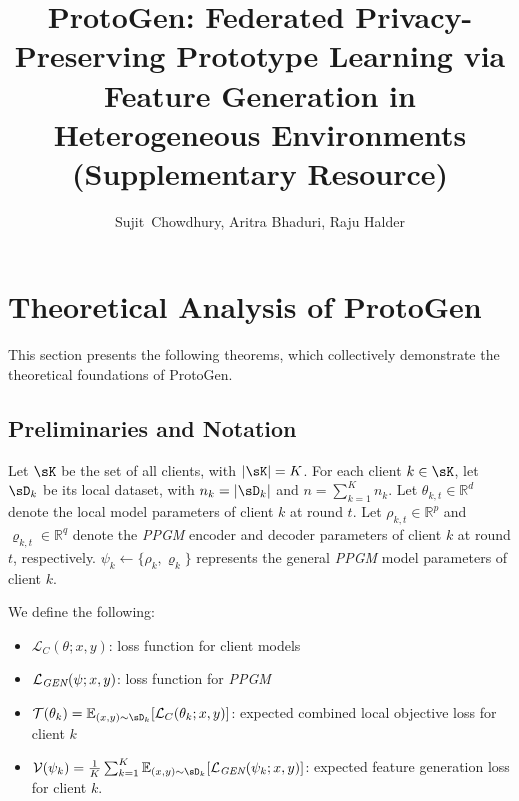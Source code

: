 \documentclass[lettersize,journal]{IEEEtran}
\title{\textsf{ProtoGen}: Federated Privacy-Preserving Prototype Learning via Feature Generation in Heterogeneous Environments\\ (Supplementary Resource)}
\author{Sujit~Chowdhury, Aritra Bhaduri, Raju Halder%
\IEEEcompsocitemizethanks{\IEEEcompsocthanksitem Sujit Chowdhury, Aritra Bhaduri, Raju Halder are with the Department
of Computer Science and Engineering, Indian Institute of Technology Patna, 
India, 801106.\protect\\
E-mail: \{sujit\_2021cs35, aritra\_2101ai40, halder\}@iitp.ac.in}
}
\begin{document}
\maketitle

\section{Theoretical Analysis of \textsf{ProtoGen}}\label{sec-th}

This section presents the following theorems, which collectively demonstrate the theoretical foundations of \textsf{ProtoGen}.

\subsection{Preliminaries and Notation}

Let $\sK$ be the set of all clients, with $|\sK| = K$. For each client $k \in \sK$, let $\sD_k$ be its local dataset, with $n_k = |\sD_k|$ and $n = \sum_{k=1}^K n_k$. Let $\theta_{k,t} \in \mathbb{R}^d$ denote the local model parameters of client $k$ at round $t$. Let $\rho_{k,t} \in \mathbb{R}^p$ and $\varrho_{k,t} \in \mathbb{R}^q$ denote the \emph{PPGM} encoder and decoder parameters of client $k$ at round $t$, respectively. $\psi_k \leftarrow\{\rho_k,\varrho_k\}$ represents the general \emph{PPGM} model parameters of client $k$. 

We define the following:
\begin{itemize}
    \item $\mathcal{L}_C(\theta; x, y)$: loss function for client models
    \item $\mathcal{L}_{\emph{GEN}}(\psi; x, y)$: loss function for \emph{PPGM}
    \item $\mathcal{T}(\theta_k) = \mathbb{E}_{(x,y)\sim\sD_k}[\mathcal{L}_C(\theta_k; x, y)]$: expected combined local objective loss for client $k$
    \item $\mathcal{V}(\psi_k) = \frac{1}{K}\sum_{k=1}^K \mathbb{E}_{(x,y)\sim\sD_k}[\mathcal{L}_{\emph{GEN}}(\psi_k; x, y)]$: expected feature generation loss for client $k$.
\end{itemize}
\end{document}
